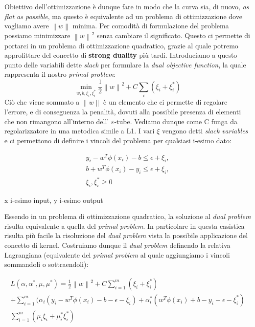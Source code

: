 \documentclass[12pt]{article}
\newcommand{\norm}[1]{\left\lVert#1\right\rVert}
\begin{document}
Obiettivo dell’ottimizzazione è dunque fare in modo che la curva sia, di nuovo, \textit{as flat as possible}, ma questo è equivalente ad un problema di ottimizzazione dove vogliamo avere $\norm{w}$ minima. 
Per comodità di formulazione del problema possiamo minimizzare $\norm{w}^2$ senza cambiare il significato. Questo ci permette di portarci in un problema di ottimizzazione quadratico, grazie al quale potremo approfittare del concetto di \textbf{strong duality} più tardi. 
Introduciamo a questo punto delle variabili dette \textit{slack} per formulare la \textit{dual objective function}, la quale rappresenta il nostro \textit{primal problem}:
	\begin{equation}\label{eq:1}
		\min_{w,b,\xi_i,\xi_i^*} \frac{1}{2}\norm{w}^2+C\sum_{i}(\xi_{i} + \xi_{i}^*)
	\end{equation}
	Ciò che viene sommato a $\norm{w}$ è un elemento che ci permette di regolare l’errore, e di conseguenza la penalità, dovuti alla possibile presenza di elementi che non rimangono all’interno dell’ $\varepsilon$-tube. Vediamo dunque come C funga da regolarizzatore in una metodica simile a L1. I vari $\xi$ vengono detti \textit{slack variables} e ci permettono di definire i vincoli del problema per qualsiasi i-esimo dato:

	\begin{equation}\label{eq:2}
	\begin{aligned}
		y_i - w^T\phi(x_i) - b \leq \epsilon + \xi_i,  \\ 
		b + w^T\phi(x_i) - y_i \leq \epsilon + \xi_i, \\
		\xi_i,\xi_i^*  \geq 0
	\end{aligned}
	\end{equation}

	\begin{center}
		\footnotesize{x i-esimo input, y i-esimo output}
	\end{center}
	
	Essendo in un problema di ottimizzazione quadratico, la soluzione al \textit{dual problem} risulta equivalente a quella del \textit{primal problem}. In particolare in questa casistica risulta più facile la risoluzione del \textit{dual problem} vista la possibile applicazione del concetto di kernel. Costruiamo dunque il \textit{dual problem} definendo la relativa Lagrangiana (equivalente del \textit{primal problem} al quale aggiungiamo i vincoli sommandoli o sottraendoli):
	

	\begin{equation}\label{eq:3}
	\begin{gathered}
		L(\alpha,\alpha^*,\mu,\mu^*) =  \frac{1}{2}\norm{w}^2+C\sum_{i=1}^{m}(\xi_{i} + \xi_{i}^*) \\
		+ \sum_{i=1}^{m}(\alpha_i(y_i - w^T\phi(x_i) - b - \epsilon - \xi_i) + \alpha_i^*(w^T\phi(x_i) + b - y_i - \epsilon - \xi_i^*) \\
		\sum_{i=1}^{m}(\mu_i\xi_i + \mu_i^*\xi_i^*)
	\end{gathered}
	\end{equation}
\end{document}
